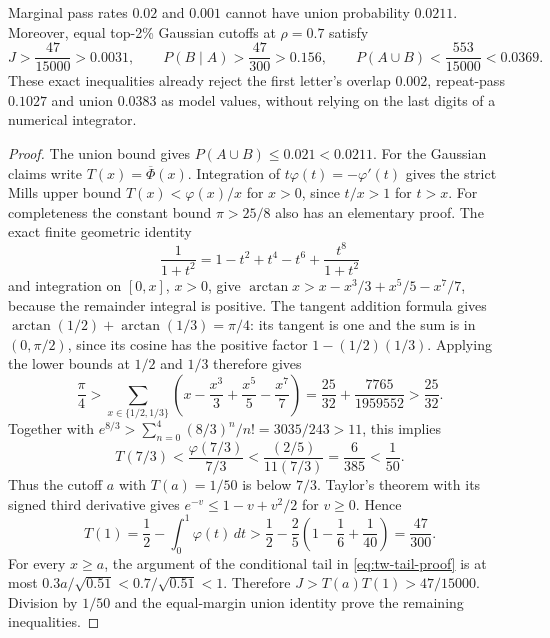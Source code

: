 \begin{proposition}
\label{tw:original-bound}
Marginal pass rates \(0.02\) and \(0.001\) cannot have union probability
\(0.0211\). Moreover, equal top-2\% Gaussian cutoffs at \(\rho=0.7\)
satisfy
\begin{equation}
 J>\frac{47}{15000}>0.0031,
 \qquad P(B\mid A)>\frac{47}{300}>0.156,
 \qquad P(A\cup B)<\frac{553}{15000}<0.0369.
 \label{eq:tw-rigorous-rejection}
\end{equation}
These exact inequalities already reject the first letter's overlap
\(0.002\), repeat-pass \(0.1027\) and union \(0.0383\) as model values,
without relying on the last digits of a numerical integrator.
\end{proposition}
\begin{proof}
The union bound gives \(P(A\cup B)\leq0.021<0.0211\).
For the Gaussian claims write \(T(x)=\overline\Phi(x)\). Integration of
\(t\varphi(t)=-\varphi'(t)\) gives the strict Mills upper bound
\(T(x)<\varphi(x)/x\) for \(x>0\), since \(t/x>1\) for \(t>x\).
For completeness the constant bound \(\pi>25/8\) also has an elementary
proof. The exact finite geometric identity
\[
 \frac1{1+t^2}=1-t^2+t^4-t^6+\frac{t^8}{1+t^2}
\]
and integration on \([0,x]\), \(x>0\), give
\(\arctan x>x-x^3/3+x^5/5-x^7/7\), because the remainder integral is
positive. The tangent addition formula gives
\(\arctan(1/2)+\arctan(1/3)=\pi/4\): its tangent is one and the
sum is in \((0,\pi/2)\), since its cosine has the positive factor
\(1-(1/2)(1/3)\). Applying the lower bounds at \(1/2\) and \(1/3\)
therefore gives
\[
 \frac\pi4>
 \sum_{x\in\{1/2,1/3\}}\left(x-\frac{x^3}{3}+\frac{x^5}{5}-\frac{x^7}{7}\right)
 =\frac{25}{32}+\frac{7765}{1959552}>\frac{25}{32}.
\]
Together with
\(e^{8/3}>\sum_{n=0}^4(8/3)^n/n!=3035/243>11\), this implies
\[
 T(7/3)<\frac{\varphi(7/3)}{7/3}
 <\frac{(2/5)}{11(7/3)}=\frac6{385}<\frac1{50}.
\]
Thus the cutoff \(a\) with \(T(a)=1/50\) is below \(7/3\).
Taylor's theorem with its signed third derivative gives
\(e^{-v}\leq1-v+v^2/2\) for \(v\geq0\). Hence
\[
 T(1)=\frac12-\int_0^1\varphi(t)\,dt
 >\frac12-\frac25\left(1-\frac16+\frac1{40}\right)
 =\frac{47}{300}.
\]
For every \(x\geq a\), the argument of the conditional tail in
\eqref{eq:tw-tail-proof} is at most
\(0.3a/\sqrt{0.51}<0.7/\sqrt{0.51}<1\). Therefore
\(J>T(a)T(1)>47/15000\). Division by \(1/50\) and the equal-margin
union identity prove the remaining inequalities.
\end{proof}

